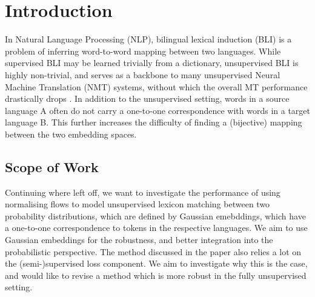 \documentclass[a4paper,12pt,twoside,openright]{report}
\begin{document}
\pagestyle{empty}
\singlespacing

\onehalfspacing

\singlespacing


\setcounter{page}{0}
\pagestyle{plain}
\tableofcontents
\listoffigures
\listoftables

\onehalfspacing

\newcommand{\norm}[1]{\left\lVert#1\right\rVert}
\newcommand{\bracket}[1]{\left[#1\right]}
\newcommand{\absdet}[1]{\left|#1\right|}

\chapter{Introduction}
\setcounter{page}{1} 

In Natural Language Processing (NLP), bilingual lexical induction (BLI) is a problem of inferring word-to-word mapping between two languages.
While supervised BLI may be learned trivially from a dictionary, unsupervised BLI is highly non-trivial, and serves as a backbone to many unsupervised Neural Machine Translation (NMT) systems, without which the overall MT performance drastically drops \cite{dropping_perf1} \cite{dropping_perf2}.
In addition to the unsupervised setting, words in a source language A often do not carry a one-to-one correspondence with words in a target language B.
This further increases the difficulty of finding a (bijective) mapping between the two embedding spaces.

\section{Scope of Work}


Continuing where \cite{density_matching} left off, we want to investigate the performance of using normalising flows to model unsupervised lexicon matching between two probability distributions, which are defined by Gaussian emebddings, which have a one-to-one correspondence to tokens in the respective languages.
We aim to use Gaussian embeddings for the robustness, and better integration into the probabilistic perspective.
The method discussed in the paper also relies a lot on the (semi-)supervised loss component.
We aim to investigate why this is the case, and would like to revise a method which is more robust in the fully unsupervised setting.\\
\end{document}
